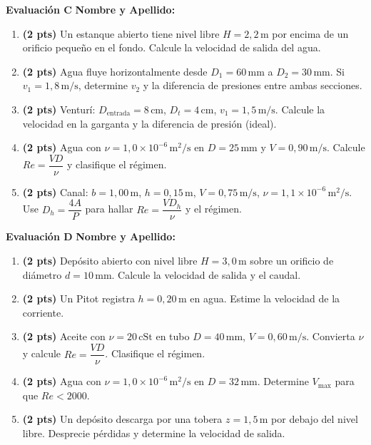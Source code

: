 \documentclass[a4paper,11pt]{article}
\begin{document}
\noindent
\begin{minipage}[t]{0.48\textwidth}
    \textbf{Evaluación C} \hfill \textbf{Nombre y Apellido: \underline{\hspace{4cm}}}

    \vspace{0.2cm}
    \begin{enumerate}
        \item \textbf{(2 pts)} Un estanque abierto tiene nivel libre $H=2{,}2\,\mathrm{m}$ por encima de un orificio pequeño en el fondo. Calcule la velocidad de salida del agua.
        \item \textbf{(2 pts)} Agua fluye horizontalmente desde $D_1=60\,\mathrm{mm}$ a $D_2=30\,\mathrm{mm}$. Si $v_1=1{,}8\,\mathrm{m/s}$, determine $v_2$ y la diferencia de presiones entre ambas secciones.
        \item \textbf{(2 pts)} Venturí: $D_\text{entrada}=8\,\mathrm{cm}$, $D_t=4\,\mathrm{cm}$, $v_1=1{,}5\,\mathrm{m/s}$. Calcule la velocidad en la garganta y la diferencia de presión (ideal).
        \item \textbf{(2 pts)} Agua con $\nu=1{,}0\times10^{-6}\,\mathrm{m^2/s}$ en $D=25\,\mathrm{mm}$ y $V=0{,}90\,\mathrm{m/s}$. Calcule \(Re=\dfrac{VD}{\nu}\) y clasifique el régimen.
        \item \textbf{(2 pts)} Canal: $b=1{,}00\,\mathrm{m}$, $h=0{,}15\,\mathrm{m}$, $V=0{,}75\,\mathrm{m/s}$, $\nu=1{,}1\times10^{-6}\,\mathrm{m^2/s}$. Use \(D_h=\dfrac{4A}{P}\) para hallar \(Re=\dfrac{V D_h}{\nu}\) y el régimen.
    \end{enumerate}
\end{minipage}\hfill
\begin{minipage}[t]{0.48\textwidth}
    \textbf{Evaluación D} \hfill \textbf{Nombre y Apellido: \underline{\hspace{4cm}}}

    \vspace{0.2cm}
    \begin{enumerate}
        \item \textbf{(2 pts)} Depósito abierto con nivel libre $H=3{,}0\,\mathrm{m}$ sobre un orificio de diámetro $d=10\,\mathrm{mm}$. Calcule la velocidad de salida y el caudal.
        \item \textbf{(2 pts)} Un Pitot registra $h=0{,}20\,\mathrm{m}$ en agua. Estime la velocidad de la corriente.
        \item \textbf{(2 pts)} Aceite con $\nu=20\,\mathrm{cSt}$ en tubo $D=40\,\mathrm{mm}$, $V=0{,}60\,\mathrm{m/s}$. Convierta $\nu$ y calcule \(Re=\dfrac{VD}{\nu}\). Clasifique el régimen.
        \item \textbf{(2 pts)} Agua con $\nu=1{,}0\times10^{-6}\,\mathrm{m^2/s}$ en $D=32\,\mathrm{mm}$. Determine $V_{\max}$ para que $Re<2000$.
        \item \textbf{(2 pts)} Un depósito descarga por una tobera $z=1{,}5\,\mathrm{m}$ por debajo del nivel libre. Desprecie pérdidas y determine la velocidad de salida.
    \end{enumerate}
\end{minipage}
\end{document}
